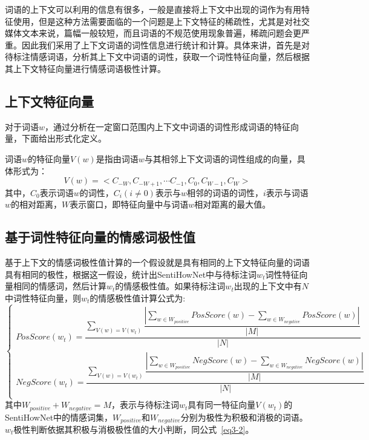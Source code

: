 词语的上下文可以利用的信息有很多，一般是直接将上下文中出现的词作为有用特征使用，但是这种方法需要面临的一个问题是上下文特征的稀疏性，尤其是对社交媒体文本来说，篇幅一般较短，而且词语的不规范使用现象普遍，稀疏问题会更严重。因此我们采用了上下文词语的词性信息进行统计和计算。具体来讲，首先是对待标注情感词语，分析其上下文中词语的词性，获取一个词性特征向量，然后根据其上下文特征向量进行情感词语极性计算。

\subsection{上下文特征向量}
对于词语$w$，通过分析在一定窗口范围内上下文中词语的词性形成词语的特征向量，下面给出形式化定义。
\begin{definition}
词语$w$的特征向量$V(w)$是指由词语$w$与其相邻上下文词语的词性组成的向量，具体形式为：
$$V(w)=<C_{-W},C_{-W+1},\cdots C_{-1},C_0,C_{W-1},C_W>$$
其中，$C_0$表示词语$w$的词性，$C_i(i\neq 0)$表示与$w$相邻的词语的词性，$i$表示与词语$w$的相对距离，$W$表示窗口，即特征向量中与词语$w$相对距离的最大值。
\end{definition}

\subsection{基于词性特征向量的情感词极性值}
基于上下文的情感词极性值计算的一个假设就是具有相同的上下文特征向量的词语具有相同的极性，根据这一假设，统计出SentiHowNet中与待标注词$ w_t$词性特征向量相同的情感词，然后计算$ w_t $的情感极性值。如果待标注词$ w_t$出现的上下文中有$ N $中词性特征向量，则$ w_t$的情感极性值计算公式为:
\begin{equation}
\label{eq3-2-1}
\begin{cases}
PosScore(w_t)=\dfrac{\sum_{V(w)=V(w_t)}\dfrac{|\sum_{w \in W_{positive}}PosScore(w)-\sum_{w \in W_{negative}}PosScore(w)|}{|M|}}{|N|} \\
NegScore(w_t)=\dfrac{\sum_{V(w)=V(w_t)}\dfrac{|\sum_{w \in W_{positive}}NegScore(w)-\sum_{w \in W_{negative}}NegScore(w)|}{|M|}}{|N|} \\
\end{cases}
\end{equation}
其中$W_{positive}+W_{negative}=M$，表示与待标注词$w_t$具有同一特征向量$ V(w_t) $的SentiHowNet中的情感词集，$W_{positive}$和$W_{negative}$分别为极性为积极和消极的词语。$w_t$极性判断依据其积极与消极极性值的大小判断，同公式~\ref{eq3-2}。

